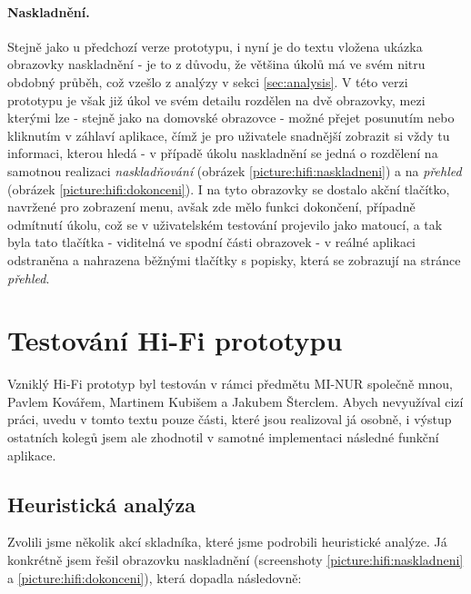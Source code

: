 \paragraph{Naskladnění.} Stejně jako u předchozí verze prototypu, i nyní je do textu vložena ukázka obrazovky naskladnění - je to z důvodu, že většina úkolů má ve svém nitru obdobný průběh, což vzešlo z analýzy v sekci \ref{sec:analysis}. V této verzi prototypu je však již úkol ve svém detailu rozdělen na dvě obrazovky, mezi kterými lze - stejně jako na domovské obrazovce - možné přejet posunutím nebo kliknutím v záhlaví aplikace, čímž je pro uživatele snadnější zobrazit si vždy tu informaci, kterou hledá - v případě úkolu naskladnění se jedná o rozdělení na samotnou realizaci \emph{naskladňování} (obrázek \ref{picture:hifi:naskladneni}) a na \emph{přehled} (obrázek \ref{picture:hifi:dokonceni}). I na tyto obrazovky se dostalo akční tlačítko, navržené pro zobrazení menu, avšak zde mělo funkci dokončení, případně odmítnutí úkolu, což se v uživatelském testování projevilo jako matoucí, a tak byla tato tlačítka - viditelná ve spodní části obrazovek - v reálné aplikaci odstraněna a nahrazena běžnými tlačítky s popisky, která se zobrazují na stránce \emph{přehled}.


\section{Testování Hi-Fi prototypu}

Vzniklý Hi-Fi prototyp byl testován v rámci předmětu MI-NUR společně mnou, Pavlem Kovářem, Martinem Kubišem a Jakubem Šterclem. Abych nevyužíval cizí práci, uvedu v tomto textu pouze části, které jsou realizoval já osobně, i výstup ostatních kolegů jsem ale zhodnotil v samotné implementaci následné funkční aplikace.


\subsection{Heuristická analýza}

Zvolili jsme několik akcí skladníka, které jsme podrobili heuristické analýze. Já konkrétně jsem řešil obrazovku naskladnění (screenshoty \ref{picture:hifi:naskladneni} a \ref{picture:hifi:dokonceni}), která dopadla následovně:

